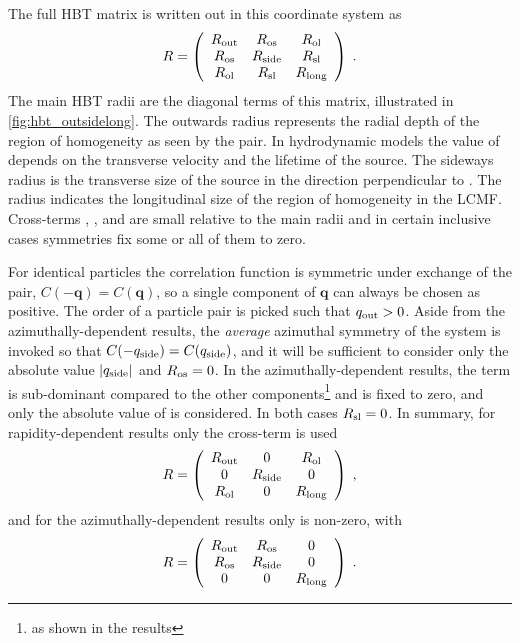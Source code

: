 The full HBT matrix is written out in this coordinate system as
\begin{equation}
  \label{eq:r_matrix_full}
  R = \left( \begin{array}{ccc}
  R_{\mathrm{out}} & R_{\mathrm{os}} & R_{\mathrm{ol}} \\
  R_{\mathrm{os}} & R_{\mathrm{side}} & R_{\mathrm{sl}} \\
  R_{\mathrm{ol}} & R_{\mathrm{sl}} & R_{\mathrm{long}}
  \end{array} \right) \; .
\end{equation}
The main HBT radii are the diagonal terms of this matrix, illustrated in \cref{fig:hbt_outsidelong}.
The outwards radius \Rout represents the radial depth of the region of homogeneity as seen by the pair.
In hydrodynamic models the value of \Rout depends on the transverse velocity and the lifetime of the source.
The sideways radius \Rside is the transverse size of the source in the direction perpendicular to \kt.
The radius \Rlong indicates the longitudinal size of the region of homogeneity in the \ac{LCMF}.
Cross-terms \Ros, \Rol, and \Rsl are small relative to the main radii and in certain inclusive cases symmetries fix some or all of them to zero.

For identical particles the correlation function is symmetric under exchange of the pair, \(C(-\mathbf{q}) = C(\mathbf{q})\), so a single component of $\mathbf{q}$ can always be chosen as positive.
The order of a particle pair is picked such that $q_{\mathrm{out}} > 0$.
Aside from the azimuthally-dependent results, the \emph{average} azimuthal symmetry of the \pPb system is invoked so that $C(-q_{\mathrm{side}}) = C(q_{\mathrm{side}})$, and it will be sufficient to consider only the absolute value $|q_{\mathrm{side}}|$ and $R_{\mathrm{os}} = 0$.
In the azimuthally-dependent results, the \Rol term is sub-dominant compared to the other components\footnote{as shown in the results} and is fixed to zero, and only the absolute value of \qlong is considered.
In both cases $R_{\mathrm{sl}} = 0$.
In summary, for rapidity-dependent results only the \Rol cross-term is used
\[
R = \left( \begin{array}{ccc}
  R_{\mathrm{out}} & 0 & R_{\mathrm{ol}} \\
  0 & R_{\mathrm{side}} & 0 \\
  R_{\mathrm{ol}} & 0 & R_{\mathrm{long}}
\end{array} \right) \;,
\]
and for the azimuthally-dependent results only \Ros is non-zero, with
\[
R = \left( \begin{array}{ccc}
  R_{\mathrm{out}} & R_{\mathrm{os}} & 0 \\
  R_{\mathrm{os}} & R_{\mathrm{side}} & 0 \\
  0 & 0 & R_{\mathrm{long}}
\end{array} \right) \; .
\]

